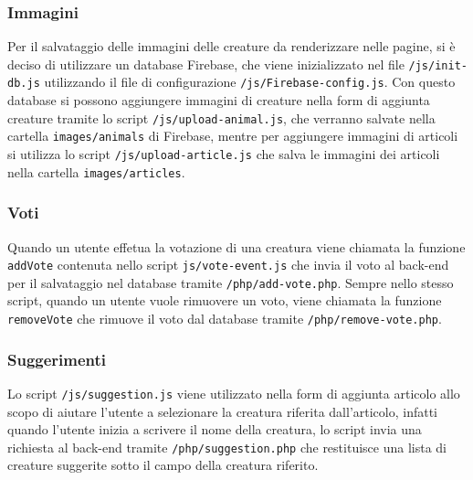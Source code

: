 \subsubsection{Immagini}
Per il salvataggio delle immagini delle creature da renderizzare nelle pagine, si è deciso di utilizzare un database Firebase, che viene inizializzato nel file \texttt{/js/init-db.js} utilizzando il file di configurazione \texttt{/js/Firebase-config.js}. 
Con questo database si possono aggiungere immagini di creature nella form di aggiunta creature tramite lo script \texttt{/js/upload-animal.js}, che verranno salvate nella cartella \texttt{images/animals} di Firebase, mentre per aggiungere immagini di articoli 
si utilizza lo script \texttt{/js/upload-article.js} che salva le immagini dei articoli nella cartella \texttt{images/articles}.

\subsubsection{Voti}
Quando un utente effetua la votazione di una creatura viene chiamata la funzione \texttt{addVote} contenuta nello script \texttt{js/vote-event.js} che invia il voto al back-end per il salvataggio nel database tramite \texttt{/php/add-vote.php}.
Sempre nello stesso script, quando un utente vuole rimuovere un voto, viene chiamata la funzione \texttt{removeVote} che rimuove il voto dal database tramite \texttt{/php/remove-vote.php}.

\subsubsection{Suggerimenti}
Lo script \texttt{/js/suggestion.js} viene utilizzato nella form di aggiunta articolo allo scopo di aiutare l'utente a selezionare la creatura riferita dall'articolo,
infatti quando l'utente inizia a scrivere il nome della creatura, lo script invia una richiesta al back-end tramite \texttt{/php/suggestion.php} che restituisce una lista di creature suggerite sotto il campo della creatura riferito.

